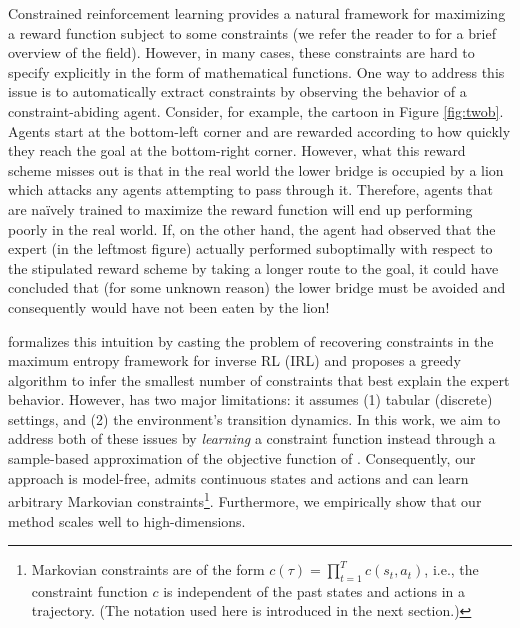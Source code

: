 \documentclass{article}
\begin{document}
Constrained reinforcement learning provides a natural framework for maximizing a reward function subject to some constraints (we refer the reader to \citet{ray2019safetygym} for a brief overview of the field). However, in many cases, these constraints are hard to specify explicitly in the form of mathematical functions. One way to address this issue is to automatically extract constraints by observing the behavior of a constraint-abiding agent. Consider, for example, the cartoon in Figure \ref{fig:twob}. Agents start at the bottom-left corner and are rewarded according to how quickly they reach the goal at the bottom-right corner. However, what this reward scheme misses out is that in the real world the lower bridge is occupied by a lion which attacks any agents attempting to pass through it. Therefore, agents that are na\"ively trained to maximize the reward function will end up performing poorly in the real world. If, on the other hand, the agent had observed that the expert (in the leftmost figure) actually performed suboptimally with respect to the stipulated reward scheme by taking a longer route to the goal, it could have concluded that (for some unknown reason) the lower bridge must be avoided and consequently would have not been eaten by the lion!

\citet{scobee2020maximum} formalizes this intuition by casting the problem of recovering constraints in the maximum entropy framework for inverse RL (IRL) \citep{ziebart2008maxent} and proposes a greedy algorithm to infer the smallest number of constraints that best explain the expert behavior. However, \citet{scobee2020maximum} has two major limitations: it assumes (1) tabular (discrete) settings, and (2) the environment's transition dynamics. In this work, we aim to address both of these issues by \textit{learning} a constraint function instead through a sample-based approximation of the objective function of \citet{scobee2020maximum}. Consequently, our approach is model-free, admits continuous states and actions and can learn arbitrary Markovian constraints\footnote{Markovian constraints are of the form $c(\tau)=\prod_{t=1}^Tc(s_t,a_t)$, i.e., the constraint function $c$ is independent of the past states and actions in a trajectory. (The notation used here is introduced in the next section.)}. Furthermore, we empirically show that our method scales well to high-dimensions.
\end{document}
